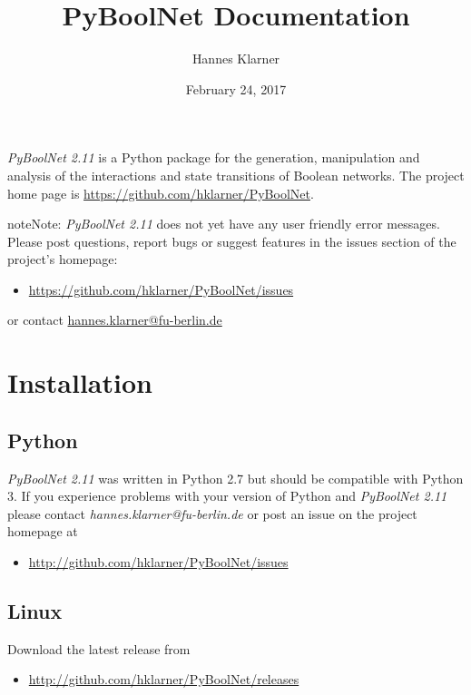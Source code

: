 \documentclass[letterpaper,10pt,english]{sphinxmanual}
\title{PyBoolNet Documentation}
\date{February 24, 2017}
\author{Hannes Klarner}
\begin{document}
\maketitle
\tableofcontents
{}\label{index::doc}
\emph{PyBoolNet 2.11} is a Python package for the generation, manipulation and analysis of the interactions and state transitions of Boolean networks.
The project home page is \href{https://github.com/hklarner/PyBoolNet}{https://github.com/hklarner/PyBoolNet}.

\begin{notice}{note}{Note:}
\emph{PyBoolNet 2.11} does not yet have any user friendly error messages.
Please post questions, report bugs or suggest features in the issues section of the project's homepage:
\begin{itemize}
\item {} 
\href{https://github.com/hklarner/PyBoolNet/issues}{https://github.com/hklarner/PyBoolNet/issues}

\end{itemize}

or contact \href{mailto:hannes.klarner@fu-berlin.de}{hannes.klarner@fu-berlin.de}
\end{notice}




\chapter{Installation}
\label{Installation:installation}\label{Installation:id1}\label{Installation::doc}\label{Installation:installation-software}

\section{Python}
\label{Installation:python}
\emph{PyBoolNet 2.11} was written in Python 2.7 but should be compatible with Python 3.
If you experience problems with your version of Python and \emph{PyBoolNet 2.11} please contact \emph{hannes.klarner@fu-berlin.de} or
post an issue on the project homepage at
\begin{itemize}
\item {} 
\href{http://github.com/hklarner/PyBoolNet/issues}{http://github.com/hklarner/PyBoolNet/issues}

\end{itemize}


\section{Linux}
\label{Installation:linux}
Download the latest release from
\begin{itemize}
\item {} 
\href{http://github.com/hklarner/PyBoolNet/releases}{http://github.com/hklarner/PyBoolNet/releases}

\end{itemize}
\end{document}
